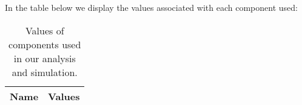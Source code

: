In the table below we display the values associated with each component used:

\begin{table}[h]
  \centering
  \begin{tabular}{|l|r|}
    \hline    
    {\bf Name} & {\bf Values} \\ \hline
     
  \end{tabular}
  \caption{Values of components used in our analysis and simulation.}
  \label{tab:data}
\end{table}